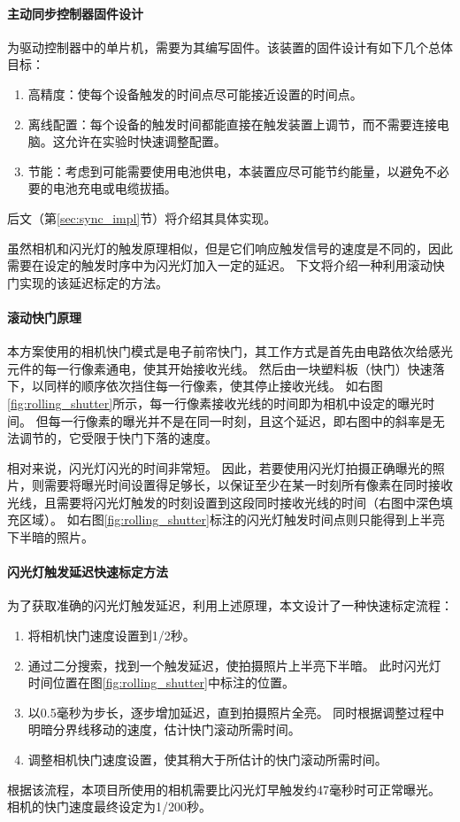 \paragraph{主动同步控制器固件设计}
为驱动控制器中的单片机，需要为其编写固件。该装置的固件设计有如下几个总体目标：
\begin{enumerate}
\item 高精度：使每个设备触发的时间点尽可能接近设置的时间点。
\item 离线配置：每个设备的触发时间都能直接在触发装置上调节，而不需要连接电脑。这允许在实验时快速调整配置。
\item 节能：考虑到可能需要使用电池供电，本装置应尽可能节约能量，以避免不必要的电池充电或电缆拔插。
\end{enumerate}
后文（第\ref{sec:sync_impl}节）将介绍其具体实现。

虽然相机和闪光灯的触发原理相似，但是它们响应触发信号的速度是不同的，因此需要在设定的触发时序中为闪光灯加入一定的延迟。
下文将介绍一种利用滚动快门实现的该延迟标定的方法。


\paragraph{滚动快门原理}
本方案使用的相机快门模式是电子前帘快门，其工作方式是首先由电路依次给感光元件的每一行像素通电，使其开始接收光线。
然后由一块塑料板（快门）快速落下，以同样的顺序依次挡住每一行像素，使其停止接收光线。
如右图\ref{fig:rolling_shutter}所示，每一行像素接收光线的时间即为相机中设定的曝光时间。
但每一行像素的曝光并不是在同一时刻，且这个延迟，即右图中的斜率是无法调节的，它受限于快门下落的速度。

相对来说，闪光灯闪光的时间非常短。
因此，若要使用闪光灯拍摄正确曝光的照片，则需要将曝光时间设置得足够长，以保证至少在某一时刻所有像素在同时接收光线，且需要将闪光灯触发的时刻设置到这段同时接收光线的时间（右图中深色填充区域）。
如右图\ref{fig:rolling_shutter}标注的闪光灯触发时间点则只能得到上半亮下半暗的照片。

\paragraph{闪光灯触发延迟快速标定方法}
为了获取准确的闪光灯触发延迟，利用上述原理，本文设计了一种快速标定流程：
\begin{enumerate}
\item 将相机快门速度设置到1/2秒。
\item 通过二分搜索，找到一个触发延迟，使拍摄照片上半亮下半暗。
此时闪光灯时间位置在图\ref{fig:rolling_shutter}中标注的位置。
\item 以0.5毫秒为步长，逐步增加延迟，直到拍摄照片全亮。
同时根据调整过程中明暗分界线移动的速度，估计快门滚动所需时间。
\item 调整相机快门速度设置，使其稍大于所估计的快门滚动所需时间。
\end{enumerate}
根据该流程，本项目所使用的相机需要比闪光灯早触发约47毫秒时可正常曝光。
相机的快门速度最终设定为1/200秒。

